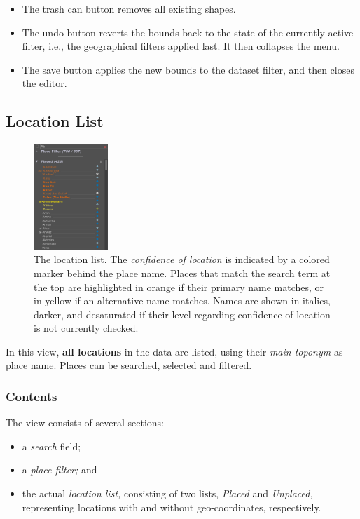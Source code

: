 \begin{itemize}
  \item The trash can button removes all existing shapes.
  \item The  undo button reverts the bounds back to the state of the currently active filter, i.e., the geographical filters applied last.
    It then collapses the menu.
  \item The save button applies the new bounds to the dataset filter, and then closes the editor.
\end{itemize}


\subsection{Location List}
\label{sec:location-list}

\begin{figure}[tb]
  \centering
  \includegraphics[width=0.25\textwidth]{../src/assets/visualization-documentation/location-list-1.png}
  \caption{
    The location list.
    The \emph{confidence of location} is indicated by a colored marker behind the place name.
    Places that match the search term at the top are highlighted in orange if their primary name matches, or in yellow if an alternative name matches.
    Names are shown in italics, darker, and desaturated if their level regarding confidence of location is not currently checked.
  }
  \label{fig:location-list-1}
\end{figure}

In this view, \textbf{all locations} in the data are listed, using their \emph{main toponym} as place name.
Places can be searched, selected and filtered.


\subsubsection{Contents}
\label{sec:location-list-contents}

The view consists of several sections:

\begin{itemize}
  \item a \emph{search} field;
  \item a \emph{place filter;} and
  \item the actual \emph{location list,} consisting of two lists, \emph{Placed} and \emph{Unplaced,} representing locations with and without geo-coordinates, respectively.
\end{itemize}

